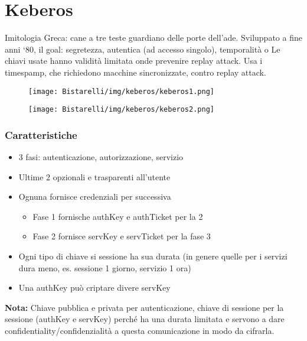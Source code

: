 \chapter{Keberos}
Imitologia Greca: cane a tre teste guardiano delle porte dell’ade. Sviluppato a fine anni ‘80, il goal: segretezza, autentica (ad accesso singolo), temporalità o Le chiavi usate hanno validità limitata onde prevenire replay attack. Usa i timespamp, che richiedono macchine sincronizzate, contro replay attack. 

\begin{figure}[H]
	\centering
    \texttt{[image: Bistarelli/img/keberos/keberos1.png]}
\end{figure}

\begin{figure}[H]
	\centering
    \texttt{[image: Bistarelli/img/keberos/keberos2.png]}
\end{figure}

\subsection{Caratteristiche}
\begin{itemize}
    \item 3 fasi: autenticazione, autorizzazione, servizio
    
    \item Ultime 2 opzionali e trasparenti all’utente
    
    \item Ognuna fornisce credenziali per successiva
    
    \begin{itemize}
        \item Fase 1 fornische authKey e authTicket per la 2
        
        \item Fase 2 fornisce servKey e servTicket per la fase 3
    \end{itemize}
    
    \item Ogni tipo di chiave si sessione ha sua durata (in genere quelle per i servizi dura meno, es. sessione 1 giorno, servizio 1 ora)
    
    \item Una authKey può criptare divere servKey
    
\end{itemize}
\textbf{Nota:} Chiave pubblica e privata per autenticazione, chiave di sessione per la sessione (authKey e servKey)
perché ha una durata limitata e servono a dare confidentiality/confidenzialità a questa comunicazione in modo da
cifrarla.

